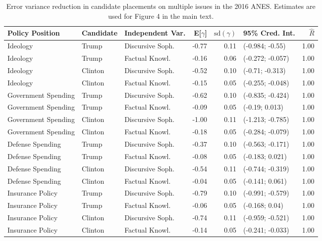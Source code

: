 \begin{table}[ht]
\centering
\caption{Error variance reduction in candidate placements on multiple issues in the 2016 ANES.
         Estimates are used for Figure 4 in the main text.} 
\label{app:hetreg2016}
\begin{tabular}{lllrrlr}
  \hline
Policy Position & Candidate & Independent Var. & E[$\gamma$] & $\text{sd}(\gamma)$ & 95\% Cred. Int. & $\hat{R}$ \\ 
  \hline
Ideology & Trump & Discursive Soph. & -0.77 & 0.11 & (-0.984; -0.55) & 1.00 \\ 
  Ideology & Trump & Factual Knowl. & -0.16 & 0.06 & (-0.272; -0.057) & 1.00 \\ 
  Ideology & Clinton & Discursive Soph. & -0.52 & 0.10 & (-0.71; -0.313) & 1.00 \\ 
  Ideology & Clinton & Factual Knowl. & -0.15 & 0.05 & (-0.255; -0.048) & 1.00 \\ 
  Government Spending & Trump & Discursive Soph. & -0.62 & 0.10 & (-0.835; -0.424) & 1.00 \\ 
  Government Spending & Trump & Factual Knowl. & -0.09 & 0.05 & (-0.19; 0.013) & 1.00 \\ 
  Government Spending & Clinton & Discursive Soph. & -1.00 & 0.11 & (-1.213; -0.785) & 1.00 \\ 
  Government Spending & Clinton & Factual Knowl. & -0.18 & 0.05 & (-0.284; -0.079) & 1.00 \\ 
  Defense Spending & Trump & Discursive Soph. & -0.37 & 0.10 & (-0.563; -0.171) & 1.00 \\ 
  Defense Spending & Trump & Factual Knowl. & -0.08 & 0.05 & (-0.183; 0.021) & 1.00 \\ 
  Defense Spending & Clinton & Discursive Soph. & -0.54 & 0.11 & (-0.744; -0.319) & 1.00 \\ 
  Defense Spending & Clinton & Factual Knowl. & -0.04 & 0.05 & (-0.141; 0.061) & 1.00 \\ 
  Insurance Policy & Trump & Discursive Soph. & -0.79 & 0.10 & (-0.991; -0.579) & 1.00 \\ 
  Insurance Policy & Trump & Factual Knowl. & -0.06 & 0.05 & (-0.168; 0.04) & 1.00 \\ 
  Insurance Policy & Clinton & Discursive Soph. & -0.74 & 0.11 & (-0.959; -0.521) & 1.00 \\ 
  Insurance Policy & Clinton & Factual Knowl. & -0.14 & 0.05 & (-0.241; -0.033) & 1.00 \\ 

\end{tabular}
\end{table}
